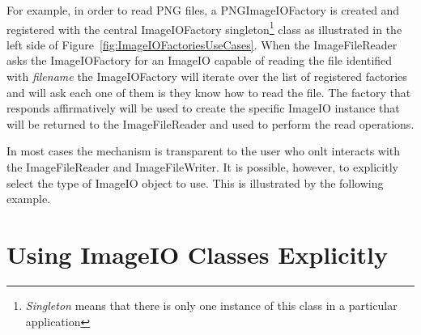 For example, in order to read PNG files, a PNGImageIOFactory is
created and registered with the central ImageIOFactory
singleton\footnote{\emph{Singleton} means that there is only one instance of
this class in a particular application} class as illustrated in the left side
of Figure~\ref{fig:ImageIOFactoriesUseCases}. When the ImageFileReader asks
the ImageIOFactory for an ImageIO capable of reading the
file identified with \emph{filename} the ImageIOFactory will iterate over the
list of registered factories and will ask each one of them is they know how
to read the file. The factory that responds affirmatively will be used to
create the specific ImageIO instance that will be returned to the
ImageFileReader and used to perform the read operations.

In most cases the mechanism is transparent to the user who onlt interacts
with the ImageFileReader and ImageFileWriter. It is
possible, however, to explicitly select the type of ImageIO object
to use.  This is illustrated by the following example.


\section{Using ImageIO Classes Explicitly}
\label{sec:ImageReadExportVTK}




